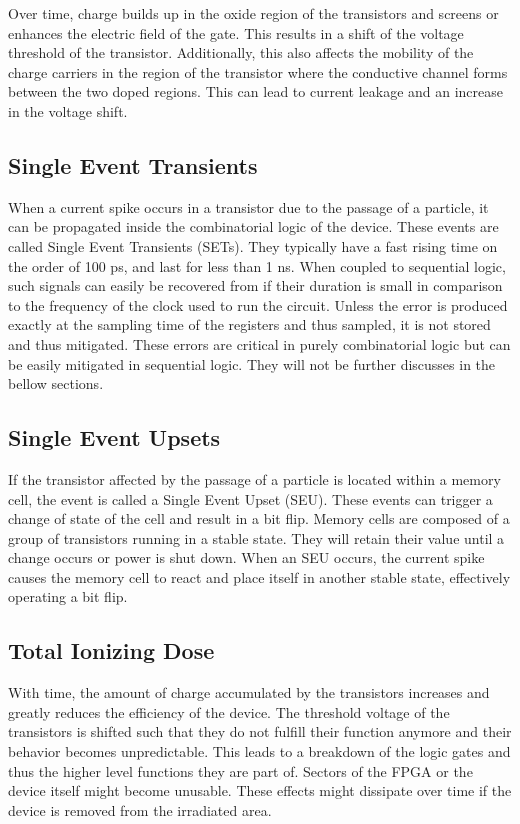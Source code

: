       Over time, charge builds up in the oxide region of the transistors and screens or enhances the electric field of the gate. This results in a shift of the voltage threshold of the transistor. Additionally, this also affects the mobility of the charge carriers in the region of the transistor where the conductive channel forms between the two doped regions. This can lead to current leakage and an increase in the voltage shift.

    \subsection{Single Event Transients}

      When a current spike occurs in a transistor due to the passage of a particle, it can be propagated inside the combinatorial logic of the device. These events are called Single Event Transients (SETs). They typically have a fast rising time on the order of 100 ps, and last for less than 1 ns. When coupled to sequential logic, such signals can easily be recovered from if their duration is small in comparison to the frequency of the clock used to run the circuit. Unless the error is produced exactly at the sampling time of the registers and thus sampled, it is not stored and thus mitigated. These errors are critical in purely combinatorial logic but can be easily mitigated in sequential logic. They will not be further discusses in the bellow sections.

    \subsection{Single Event Upsets}

      If the transistor affected by the passage of a particle is located within a memory cell, the event is called a Single Event Upset (SEU). These events can trigger a change of state of the cell and result in a bit flip. Memory cells are composed of a group of transistors running in a stable state. They will retain their value until a change occurs or power is shut down. When an SEU occurs, the current spike causes the memory cell to react and place itself in another stable state, effectively operating a bit flip.

    \subsection{Total Ionizing Dose}

      With time, the amount of charge accumulated by the transistors increases and greatly reduces the efficiency of the device. The threshold voltage of the transistors is shifted such that they do not fulfill their function anymore and their behavior becomes unpredictable. This leads to a breakdown of the logic gates and thus the higher level functions they are part of. Sectors of the FPGA or the device itself might become unusable. These effects might dissipate over time if the device is removed from the irradiated area.

